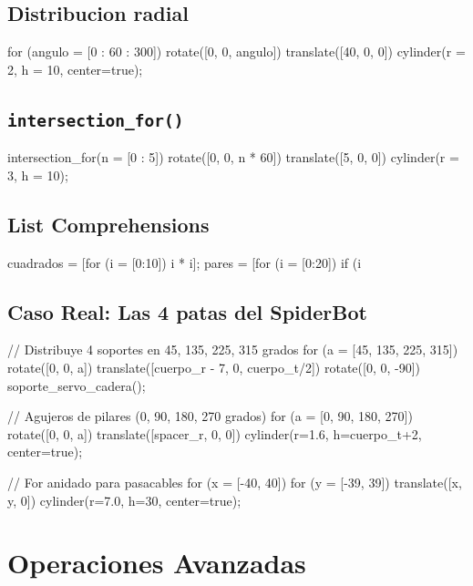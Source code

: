 \documentclass[12pt, oneside, a4paper]{report}
\newcommand{\codigo}[1]{\texttt{#1}}
\begin{document}
\section{Distribucion radial}
\begin{openscad}
for (angulo = [0 : 60 : 300]) {
    rotate([0, 0, angulo])
        translate([40, 0, 0])
            cylinder(r = 2, h = 10, center=true);
}
\end{openscad}

\section{\codigo{intersection\_for()}}
\begin{openscad}
intersection_for(n = [0 : 5]) {
    rotate([0, 0, n * 60])
        translate([5, 0, 0])
            cylinder(r = 3, h = 10);
}
\end{openscad}

\section{List Comprehensions}
\begin{openscad}
cuadrados = [for (i = [0:10]) i * i];
pares = [for (i = [0:20]) if (i %
\end{openscad}

\section{Caso Real: Las 4 patas del SpiderBot}
\begin{openscad}
// Distribuye 4 soportes en 45, 135, 225, 315 grados
for (a = [45, 135, 225, 315]) {
    rotate([0, 0, a])
        translate([cuerpo_r - 7, 0, cuerpo_t/2])
            rotate([0, 0, -90])
                soporte_servo_cadera();
}

// Agujeros de pilares (0, 90, 180, 270 grados)
for (a = [0, 90, 180, 270]) {
    rotate([0, 0, a])
        translate([spacer_r, 0, 0])
            cylinder(r=1.6, h=cuerpo_t+2, center=true);
}

// For anidado para pasacables
for (x = [-40, 40]) {
    for (y = [-39, 39]) {
        translate([x, y, 0])
            cylinder(r=7.0, h=30, center=true);
    }
}
\end{openscad}

\chapter{Operaciones Avanzadas}
\end{document}
